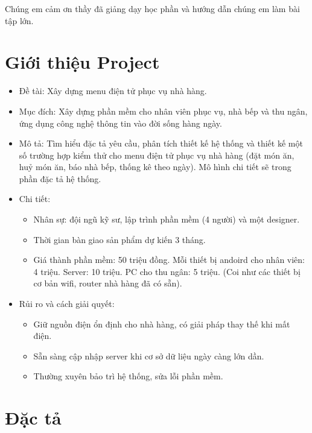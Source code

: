 \documentclass[a4paper,12pt]{report}
\begin{document}
Chúng em cảm ơn thầy đã giảng dạy học phần và hướng dẫn chúng em làm bài tập lớn.

\chapter{Giới thiệu Project}
\begin{itemize}
\item Đề tài: Xây dựng menu điện tử phục vụ nhà hàng. 
\item Mục đích: Xây dựng phần mềm cho nhân viên phục vụ, nhà bếp và thu ngân, ứng dụng công nghệ thông tin vào đời sống hàng ngày.
\item Mô tả: Tìm	hiểu đặc	tả yêu	cầu,	phân	tích	thiết kế hệ thống	và	thiết	kế một	số
trường	hợp	kiểm	thử cho menu	điện	tử phục	vụ nhà	hàng (đặt	món	ăn,	huỷ món	
ăn,	báo	nhà	bếp,	thống	kê	theo	ngày). Mô hình chi tiết sẽ trong phần đặc tả hệ thống.
\item Chi tiết:
\begin{itemize}
       \item Nhân sự: đội ngũ kỹ sư, lập trình phần mềm (4 người) và một designer.
       \item Thời gian bàn giao sản phẩm dự kiến 3 tháng.
       \item Giá thành phần mềm: 50 triệu đồng. Mỗi thiết bị andoird cho nhân viên: 4 triệu. Server: 10 triệu. PC cho thu ngân: 5 triệu. (Coi như các thiết bị cơ bản wifi, router nhà hàng đã có sẵn).
      \end{itemize}
\item Rủi ro và cách giải quyết:
\begin{itemize}
        \item{Giữ nguồn điện ổn định cho nhà hàng, có giải pháp thay thế khi mất điện.}
        \item{Sẵn sàng cập nhập server khi cơ sở dữ liệu ngày càng lớn dần.}
        \item{Thường xuyên bảo trì hệ thống, sửa lỗi phần mềm.}
      \end{itemize}
\end{itemize}


\chapter{Đặc tả}
\end{document}
